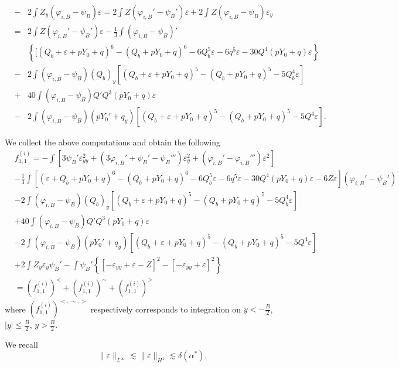 \documentclass[11pt,a4paper,reqno]{amsart}
\theoremstyle{remark}
\numberwithin{equation}{section}
\newcommand{\be}{\begin{equation}}
\newcommand{\ee}{\end{equation}}
\newcommand{\bee}{\begin{eqnarray*}}
\newcommand{\eee}{\end{eqnarray*}}
\def\e{\varepsilon}
\def\zz{Z}
\def\Yz{Y_0}
\begin{document}
\bee
&-& 2 \int \zz_y(\varphi_{i,B}-\psi_B)\e =
2 \int \zz (\varphi_{i,B}'-\psi_B')\e + 2\int \zz (\varphi_{i,B}-\psi_B)\e_y\\
& = & 2 \int \zz (\varphi_{i,B}'-\psi_B')\e - \frac 13\int(\varphi_{i,B}-\psi_B)'\\ &&\left\{[(Q_b+\e+p\Yz+q)^6-(Q_b+p\Yz+q)^6-6Q_b^5\e -6q^5 \e -30 Q^4(p\Yz+q)\e  \right\}\\
& - & 2\int (\varphi_{i,B}-\psi_B)(Q_b)_y[(Q_b+\e+p\Yz+q)^5-(Q_b +p\Yz+q)^5-5Q_b^4\e]\\
& + & 40 \int (\varphi_{i,B}-\psi_B) Q' Q^3 (p\Yz+q) \e\\
& - & 2 \int (\varphi_{i,B}-\psi_B)(p \Yz'+q_y) [(Q_b+\e+p\Yz+q)^5-(Q_b +p\Yz+q)^5-5Q^4\e].
\eee

We collect the above computations and obtain the following
\begin{align*}
& f^{(i)}_{1,1} = -\int\left[3\psi_B'\e_{yy}^2+(3\varphi_{i,B}'+\psi_B'-\psi_B''')\e_y^2+(\varphi_{i,B}'-\varphi_{i,B}''')\e^2\right]\\
& -\frac 13 \int \left[ (\varepsilon {+} Q_b {+}p\Yz{+}q )^6{-}  {(Q_b{+}p\Yz{+}q) ^6}  {-}6 Q_b ^5 \varepsilon {-} 6 q^5 \e{-} 30 Q^4(p\Yz{+}q)\e{-}6Z \varepsilon \right](\varphi_{i,B}'{-}\psi_B')\\
& -   2\int (\varphi_{i,B}-\psi_B)(Q_b)_y[(Q_b+\e+p\Yz+q)^5-(Q_b +p\Yz+q)^5-5Q_b^4\e]\\
& + 40 \int (\varphi_{i,B}-\psi_B) Q' Q^3 (p\Yz+q) \e\\
& -   2 \int (\varphi_{i,B}-\psi_B)(p  \Yz'+q_y) [(Q_b+\e+p\Yz+q)^5-(Q_b +p\Yz+q)^5-5Q^4\e]\\
& +    2 \int Z_y \e_y \psi_B'  -  \int\psi_B'\left\{\left[-\e_{yy}+ \varepsilon  -\zz \right]^2-\left[-\e_{yy}+\e\right]^2\right\}\\
& =  (f^{(i)}_{1,1})^<+(f^{(i)}_{1,1})^{\sim}+(f^{(i)}_{1,1})^>
\end{align*}
where $(f^{(i)}_{1,1})^{<,\sim,>}$ respectively corresponds to integration on $y<-\frac B2$, $|y|\leq \frac B2$, $y>\frac B2$.

We recall
\be
\label{nonlinearsobolev}
 \|\e \|_{L^\infty} \lesssim \|\e\|_{H^1} \lesssim  {\delta(\alpha^*)}  .
\ee

 
\end{document}
